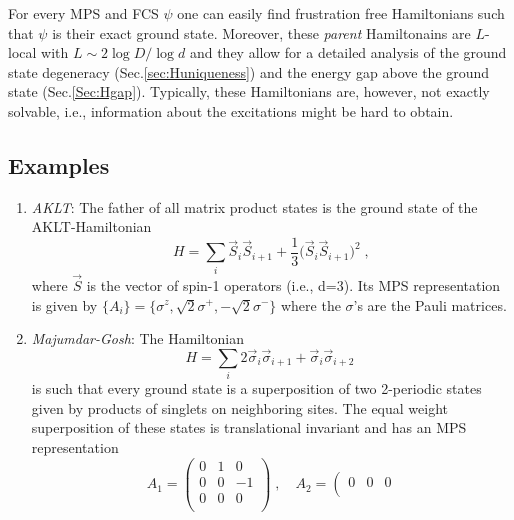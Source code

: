 \documentclass[aps,prl,epsfig,graphics,floatfix,mathbbm,a4paper]{article}
\newcommand{\1}{\mathbbm{1}}
\renewcommand{\>}{\rangle}
\newcommand{\<}{\langle}
\begin{document}
For every MPS and FCS $\psi$ one can easily find frustration free
Hamiltonians such that $\psi$ is their exact ground state.
Moreover, these \emph{parent} Hamiltonains are $L$-local with
$L\sim 2 \log D/\log d$ and they allow for a detailed analysis of
the ground state degeneracy (Sec.\ref{sec:Huniqueness}) and the
energy gap above the ground state (Sec.\ref{Sec:Hgap}). Typically,
these Hamiltonians are, however, not exactly solvable, i.e.,
information about the excitations might be hard to obtain.

\subsection{Examples}
\begin{enumerate}
    \item {\it AKLT}: The father of all matrix product states is
          the ground state of the AKLT-Hamiltonian
          \begin{equation}\label{HAKLT}
              H=\sum_i
              \vec{S}_i\vec{S}_{i+1}+\frac13\Big(\vec{S}_i\vec{S}_{i+1}\Big)^2\;,
          \end{equation}
          where $\vec{S}$ is the vector of spin-1 operators (i.e., d=3).
          Its MPS representation is given by
          $\{A_i\}=\big\{\sigma^z,\sqrt{2}\sigma^+,-\sqrt{2}\sigma^-\big\}$
          where the $\sigma$'s are the Pauli matrices.
    \item {\it Majumdar-Gosh}: The  Hamiltonian
          \begin{equation}\label{HMG}
              H=\sum_i 2\vec{\sigma}_i\vec\sigma_{i+1} +
              \vec{\sigma}_i\vec\sigma_{i+2}\;
          \end{equation}
          is such that every ground state is a superposition of two 2-periodic states given by products of singlets on neighboring sites.
          The equal weight superposition of these states is
          translational invariant and has an MPS representation
          \begin{equation}
              A_1=\left(%
              \begin{array}{ccc}
                  0 & 1 & 0  \\
                  0 & 0 & -1 \\
                  0 & 0 & 0  \\
              \end{array}%
              \right)\;,\quad A_2=\left(\begin{array}{ccc}
                  0 & 0 & 0 \\

\end{array}
\end{equation}
\end{enumerate}
\end{document}

